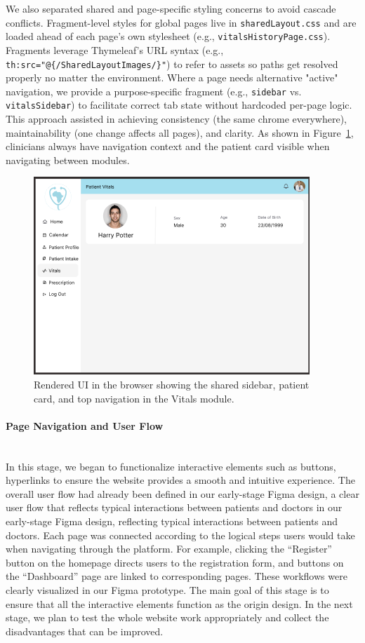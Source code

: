 We also separated shared and page-specific styling concerns to avoid cascade conflicts. Fragment-level styles for global pages live in \verb|sharedLayout.css| and are loaded ahead of each page's own stylesheet (e.g., \verb|vitalsHistoryPage.css|). Fragments leverage Thymeleaf's URL syntax (e.g., \verb|th:src="@{/SharedLayoutImages/}"|) to refer to assets so paths get resolved properly no matter the environment. Where a page needs alternative "active" navigation, we provide a purpose-specific fragment (e.g., \verb|sidebar| vs. \verb|vitalsSidebar|) to facilitate correct tab state without hardcoded per-page logic. This approach assisted in achieving consistency (the same chrome everywhere), maintainability (one change affects all pages), and clarity. As shown in Figure~\ref{fig:3-2-2-renderLayout}, clinicians always have navigation context and the patient card visible when navigating between modules.

\begin{figure}[H]
  \centering
  \includegraphics[width=0.8\linewidth]{images03/3-2-2-renderLayout.png} 
  \caption{Rendered UI in the browser showing the shared sidebar, patient card, and top navigation in the Vitals module.}
  \label{fig:3-2-2-renderLayout}
\end{figure}

\paragraph{Page Navigation and User Flow}\mbox{}\\
In this stage, we began to functionalize interactive elements such as buttons, hyperlinks to ensure the website provides a smooth and intuitive experience. The overall user flow had already been defined in our early-stage Figma design, a clear user flow that reflects typical interactions between patients and doctors in our early-stage Figma design, reflecting typical interactions between patients and doctors. Each page was connected according to the logical steps users would take when navigating through the platform. For example, clicking the “Register” button on the homepage directs users to the registration form, and buttons on the “Dashboard” page are linked to corresponding pages. These workflows were clearly visualized in our Figma prototype. The main goal of this stage is to ensure that all the interactive elements function as the origin design. In the next stage, we plan to test the whole website work appropriately and collect the disadvantages that can be improved.
